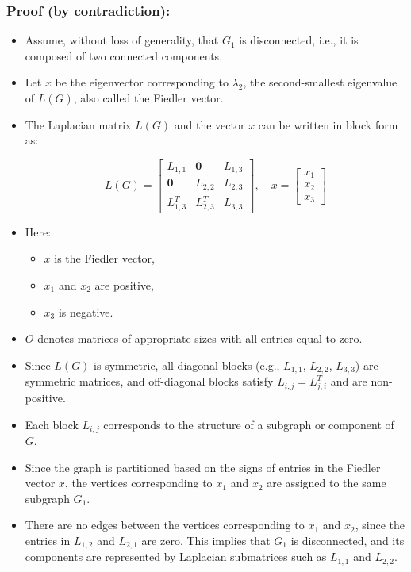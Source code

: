 \documentclass[hidelinks,12pt]{article}
\begin{document}
\subsubsection*{Proof (by contradiction):}

\begin{itemize}
    \item Assume, without loss of generality, that $G_1$ is disconnected, i.e., it is composed of two connected components.
    
    \item Let $x$ be the eigenvector corresponding to $\lambda_2$, the second-smallest eigenvalue of $L(G)$, also called the Fiedler vector.
    
    \item The Laplacian matrix $L(G)$ and the vector $x$ can be written in block form as:

    \[
    L(G) = 
    \begin{bmatrix}
        L_{1,1} & \mathbf{0} & L_{1,3} \\
        \mathbf{0} & L_{2,2} & L_{2,3} \\
        L_{1,3}^T & L_{2,3}^T & L_{3,3}
    \end{bmatrix}, \quad
    x = 
    \begin{bmatrix}
        x_1 \\
        x_2 \\
        x_3
    \end{bmatrix}
    \]
    
    \item Here:
    \begin{itemize}
        \item $x$ is the Fiedler vector,
        \item $x_1$ and $x_2$ are positive,
        \item $x_3$ is negative.
    \end{itemize}

    \item $O$ denotes matrices of appropriate sizes with all entries equal to zero.
    
    \item Since $L(G)$ is symmetric, all diagonal blocks (e.g., $L_{1,1}$, $L_{2,2}$, $L_{3,3}$) are symmetric matrices, and off-diagonal blocks satisfy $L_{i,j} = L_{j,i}^T$ and are non-positive.
    
    \item Each block $L_{i,j}$ corresponds to the structure of a subgraph or component of $G$.
    
    \item Since the graph is partitioned based on the signs of entries in the Fiedler vector $x$, the vertices corresponding to $x_1$ and $x_2$ are assigned to the same subgraph $G_1$.
    
    \item There are no edges between the vertices corresponding to $x_1$ and $x_2$, since the entries in $L_{1,2}$ and $L_{2,1}$ are zero. This implies that $G_1$ is disconnected, and its components are represented by Laplacian submatrices such as $L_{1,1}$ and $L_{2,2}$.
\end{itemize}
\end{document}

